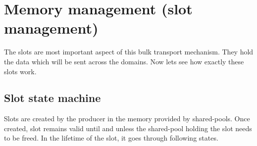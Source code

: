 \documentclass[a4paper,twoside]{report} %
\begin{document}
\section{Memory management (slot management)}
\label{sec:memory-management}
The slots are most important aspect of this bulk transport mechanism.
They hold the data which will be sent across the domains.  Now lets
see how exactly these slots work.


\subsection{Slot state machine}
Slots are created by the producer in the memory provided by 
shared-pools.  Once created, slot remains valid until and unless the
shared-pool holding the slot needs to be freed.  In the lifetime of
the slot, it goes through following states.
\end{document}
